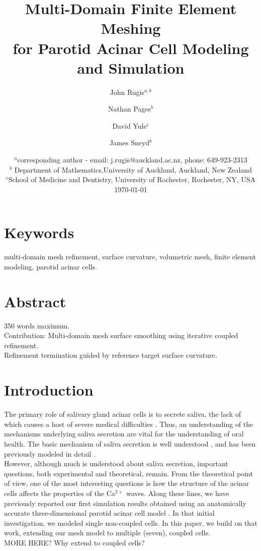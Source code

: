 \documentclass[a4paper,10pt]{article}
\title{Multi-Domain Finite Element Meshing\\for Parotid Acinar Cell Modeling and Simulation}
\author{John Rugis$^{a,b}$ \and Nathan Pages$^b$ \and David Yule$^c$ \and James Sneyd$^b$}
\date{%
  $^a$corresponding author - email: j.rugis@auckland.ac.nz, phone: 649-923-2313\\%
  $^b$ Department of Mathematics,University of Auckland, Auckland, New Zealand\\%
  $^c$School of Medicine and Dentistry, University of Rochester, Rochester, NY, USA\\[2ex]%
  \today
}
\begin{document}
\maketitle

\section*{Keywords}
multi-domain mesh refinement, surface curvature, volumetric mesh, finite element modeling, parotid acinar cells.\\

\section*{Abstract}
350 words maximum.\\
Contribution: Multi-domain mesh surface smoothing using iterative coupled refinement.\\ 
Refinement termination guided by reference target surface curvature.\\  

\section{Introduction}
The primary role of salivary gland acinar cells is to secrete saliva, the lack of which causes a host of severe medical difficulties \cite{fox1985,melvin1991}. Thus, an understanding of the mechanisms underlying saliva secretion are vital for the understanding of oral health.  The basic mechanism of saliva secretion is well understood \cite{nauntofte1992}, and has been previously modeled in detail \cite{sneyd2003}.\\

However, although much is understood about saliva secretion, important questions, both experimental and theoretical, remain. From the theoretical point of view, one of the most interesting questions is how the structure of the acinar cells affects the properties of the Ca$^{2+}$ waves. Along these lines, we have previously reported our first simulation results obtained using an anatomically accurate three-dimensional parotid acinar cell model \cite{Sneyd2017383}. In that initial investigation, we modeled single non-coupled cells. In this paper, we build on that work, extending our mesh model to multiple (seven), coupled cells.\\   

MORE HERE? Why extend to coupled cells?\\
\end{document}
